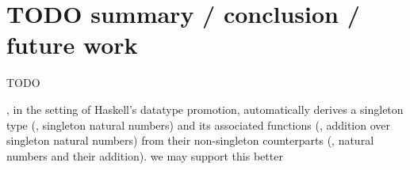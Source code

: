 \section{TODO summary / conclusion / future work}
TODO

\citet{EisWei12}, in the setting of Haskell's datatype promotion,
automatically derives a singleton type (\eg, singleton natural numbers) and
its associated functions (\eg, addition over singleton natural numbers) from
their non-singleton counterparts (\eg, natural numbers and their addition).
we may support this better

